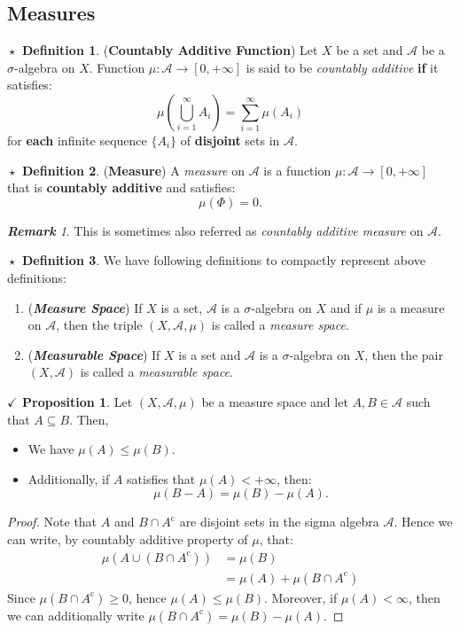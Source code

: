 \documentclass{article}
\theoremstyle{definition}
\newtheorem{definition}{$\boxed{\star}$ Definition}
\theoremstyle{remark}
\newtheorem*{remark}{\textbf{Remark}}
\theoremstyle{definition}
\theoremstyle{definition}
\newtheorem{proposition}{$\checkmark$ Proposition}
\theoremstyle{definition}
\newcommand{\union}{\cup}
\newcommand{\intrs}{\cap}
\newcommand{\bunion}{\bigcup}
\newcommand{\alg}[1]{\mathscr{#1}}
\newcommand{\comp}[1]{#1^{\text{c}}}
\begin{document}
\subsection{Measures}
\begin{definition}
	(\textbf{Countably Additive Function}) Let $ X $ be a set and $ \alg{A} $ be a $ \sigma $-algebra on $ X $. Function $ \mu : \alg{A} \longrightarrow [0,+\infty]$ is said to be \emph{countably additive} \textbf{if} it satisfies:
	\[\mu\left (\bunion_{i=1}^\infty A_i\right ) = \sum_{i=1}^\infty \mu(A_i) \]
	for \textbf{each} infinite sequence $ \{A_i\} $ of \textbf{disjoint} sets in $ \alg{A} $.
\end{definition}
\hrulefill
\begin{definition}
	(\textbf{Measure}) A \emph{measure} on $ \alg{A} $ is a function $ \mu: \alg{A} \to [0,+\infty] $ that is \textbf{countably additive} and satisfies:
	\[\mu(\Phi) = 0.\]
\end{definition}
\begin{remark}
	This is sometimes also referred as \emph{countably additive measure} on $ \alg{A} $.
\end{remark}
\hrulefill
\begin{definition}
	We have following definitions to compactly represent above definitions:
	\begin{enumerate}
		\item {(\textbf{\emph{Measure Space}}) If $ X $ is a set, $ \alg{A} $ is a $ \sigma$-algebra on $ X $ and if $ \mu $ is a measure on $ \alg{A} $, then the triple $ (X,\alg{A}, \mu) $ is called a \emph{measure space}.}
		\item {(\textbf{\emph{Measurable Space}}) If $ X $ is a set and $ \alg{A} $ is a $ \sigma $-algebra on $ X $, then the pair $ (X,\alg{A}) $ is called a \emph{measurable space}.}
	\end{enumerate}
\end{definition}
\hrulefill
\begin{proposition}
	\label{P-5}
	Let $ (X,\alg{A},\mu) $ be a measure space and let $ A, B\in \alg{A} $ such that $ A\subseteq B$. Then,
	\begin{itemize}
		\item {We have $ \mu(A) \le \mu(B) $.}
		\item {Additionally, if $ A $ satisfies that $ \mu(A)< +\infty $, then:
	\[\mu(B-A) = \mu(B) - \mu(A).\]	
	}
	\end{itemize}
\end{proposition}
\begin{proof}
	Note that $ A $ and $ B\intrs \comp{A} $ are disjoint sets in the sigma algebra $ \alg{A} $. Hence we can write, by countably additive property of $ \mu $, that:
	\begin{equation*}
		\begin{split}
			\mu(A\union \left (B\intrs \comp{A}\right )) &= \mu(B)\\
			&=  \mu(A) + \mu(B\intrs \comp{A})
		\end{split}
	\end{equation*}
Since $ \mu(B\intrs \comp{A}) \ge 0$, hence $ \mu(A)\le \mu(B) $. Moreover, if $ \mu(A) <\infty $, then we can additionally write $ \mu(B\intrs \comp{A})  = \mu(B) - \mu(A)$.
\end{proof}
\end{document}
